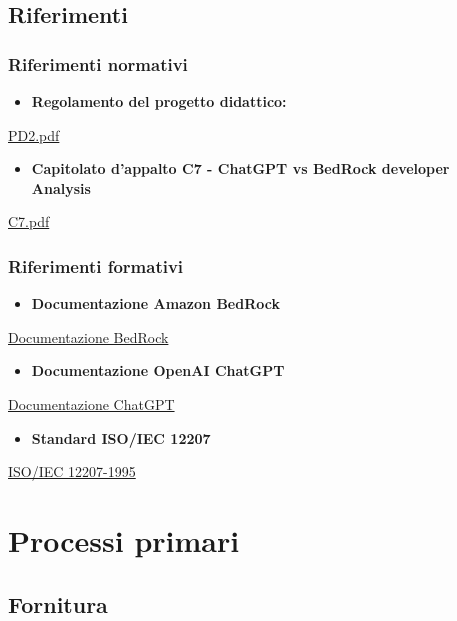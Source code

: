 \documentclass{article}
\begin{document}
\subsection{Riferimenti}

\subsubsection{Riferimenti normativi}
\begin{itemize}
    \item \textbf{Regolamento del progetto didattico:}
\end{itemize}
\href{https://www.math.unipd.it/~tullio/IS-1/2023/Dispense/PD2.pdf}{PD2.pdf}
\begin{itemize}
    \item \textbf{Capitolato d'appalto C7 - ChatGPT vs BedRock developer Analysis}
\end{itemize}
\href{https://www.math.unipd.it/~tullio/IS-1/2023/Progetto/C7.pdf}{C7.pdf}

\subsubsection{Riferimenti formativi}
\begin{itemize}
    \item \textbf{Documentazione Amazon BedRock}
\end{itemize}
\href{https://docs.aws.amazon.com/bedrock/latest/userguide/what-is-bedrock.html}{Documentazione BedRock}
\begin{itemize}
    \item \textbf{Documentazione OpenAI ChatGPT}
\end{itemize}
\href{https://platform.openai.com/docs/introduction}{Documentazione ChatGPT}
\begin{itemize}
    \item \textbf{Standard ISO/IEC 12207}
\end{itemize}
\href{https://www.math.unipd.it/~tullio/IS-1/2009/Approfondimenti/ISO_12207-1995.pdf}{ISO/IEC 12207-1995}

\section{Processi primari}

\subsection{Fornitura}
\end{document}
